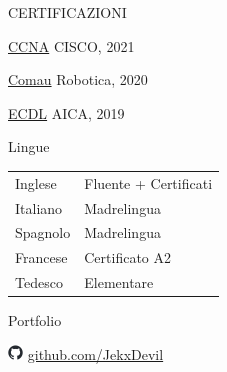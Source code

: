 \documentclass{cv} %
\def\iconsize{0.4cm}
\def\sidespacing{0.5cm}
\begin{document}
\begin{minipage}[b][0.9\paperheight][t]{0.29\linewidth}
    \vspace{\sidespacing}

    \begin{rSection}{CERTIFICAZIONI}
        \item \underline{CCNA} {CISCO, 2021}
        \item \underline{Comau} {Robotica, 2020}
        \item \underline{ECDL} {AICA, 2019}
    \end{rSection}

    \vspace{\sidespacing}

    \begin{rSection}{Lingue}
        \vspace{0.2cm}
        \item \begin{tabular}{@{}ll@{}}
            Inglese  & Fluente + Certificati \\
            Italiano & Madrelingua           \\
            Spagnolo & Madrelingua           \\
            Francese & Certificato A2        \\
            Tedesco  & Elementare            \\
        \end{tabular}
    \end{rSection}

    \vspace{\sidespacing}

    \begin{rSection}{Portfolio}
        \item[]\includegraphics[width=\iconsize, trim={0cm 0.4cm 0cm 0cm}]{github-mark.png}
        \href{https://github.com/JekxDevil}{github.com/JekxDevil}


\end{rSection}
\end{minipage}
\end{document}
